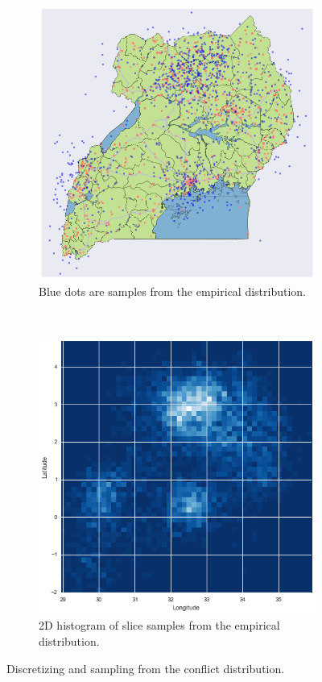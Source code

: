 \documentclass[a0,final]{a0poster}
\begin{document}
\begin{multicols}{3}
\begin{figure}[H]
  \centering
  \begin{subfigure}[b]{0.5\columnwidth}
    \centering
    \includegraphics[width=\textwidth]{../write-up/figures/1000-slice-samples}
    \caption{Blue dots are samples from the empirical distribution.}
    \label{fig:sampled-conflicts}
  \end{subfigure}~\begin{subfigure}[b]{0.5\columnwidth}
    \centering
    \includegraphics[width=\textwidth]{../write-up/figures/histogram}
    \caption{2D histogram of slice samples from the empirical distribution.}
    \label{fig:histogram}
  \end{subfigure}
  \caption{Discretizing and sampling from the conflict distribution.}
\end{figure}



\end{multicols}
\end{document}
